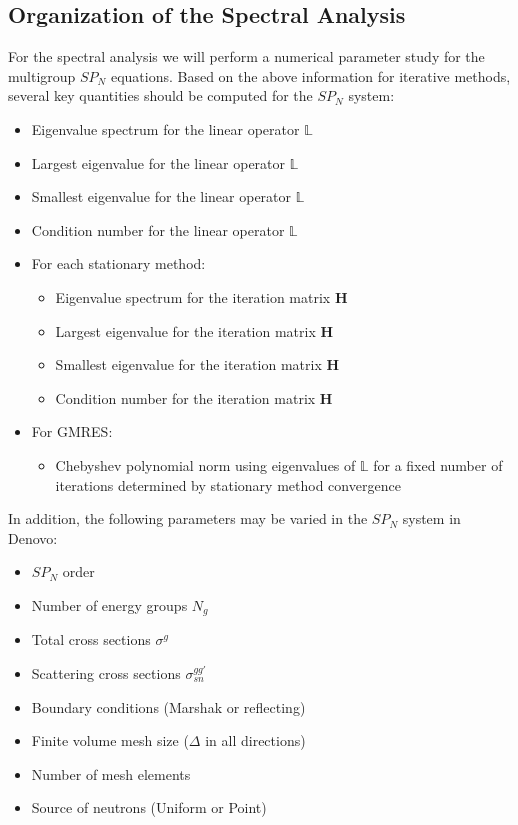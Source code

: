 \documentclass[letterpaper,12pt]{article}
\begin{document}
\subsection{Organization of the Spectral Analysis}
\label{subsec:spectral_organization}
For the spectral analysis we will perform a numerical parameter study
for the multigroup $SP_N$ equations. Based on the above information
for iterative methods, several key quantities should be computed for
the $SP_N$ system:
\begin{itemize}
\item Eigenvalue spectrum for the linear operator $\mathbb{L}$
\item Largest eigenvalue for the linear operator $\mathbb{L}$
\item Smallest eigenvalue for the linear operator $\mathbb{L}$
\item Condition number for the linear operator $\mathbb{L}$
\item For each stationary method:
  \begin{itemize}
  \item Eigenvalue spectrum for the iteration matrix $\mathbf{H}$
  \item Largest eigenvalue for the iteration matrix $\mathbf{H}$
  \item Smallest eigenvalue for the iteration matrix $\mathbf{H}$
  \item Condition number for the iteration matrix $\mathbf{H}$
  \end{itemize}
\item For GMRES:
  \begin{itemize}
  \item Chebyshev polynomial norm using eigenvalues of $\mathbb{L}$
    for a fixed number of iterations determined by stationary method
    convergence
  \end{itemize}
\end{itemize}
In addition, the following parameters may be varied in the $SP_N$
system in Denovo:
\begin{itemize}
  \item $SP_N$ order
  \item Number of energy groups $N_g$
  \item Total cross sections $\sigma^g$
  \item Scattering cross sections $\sigma_{sn}^{gg'}$
  \item Boundary conditions (Marshak or reflecting)
  \item Finite volume mesh size ($\Delta$ in all directions)
  \item Number of mesh elements
  \item Source of neutrons (Uniform or Point)
\end{itemize}
\end{document}
